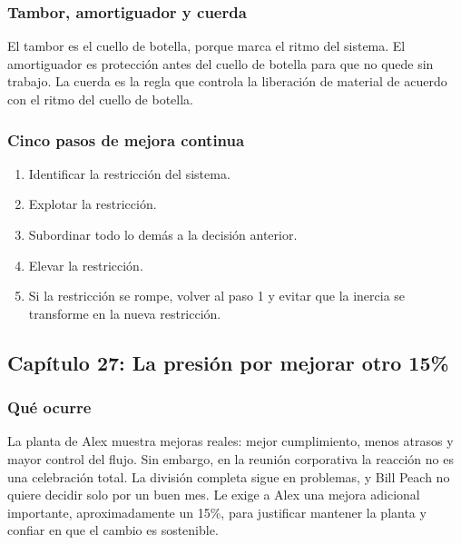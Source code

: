 \documentclass[
  11pt,
]{article}
\providecommand{\tightlist}{%
  \setlength{\itemsep}{0pt}\setlength{\parskip}{0pt}}
\begin{document}
\hypertarget{tambor-amortiguador-y-cuerda}{%
\subsubsection{Tambor, amortiguador y
cuerda}\label{tambor-amortiguador-y-cuerda}}

El tambor es el cuello de botella, porque marca el ritmo del sistema. El
amortiguador es protección antes del cuello de botella para que no quede
sin trabajo. La cuerda es la regla que controla la liberación de
material de acuerdo con el ritmo del cuello de botella.

\hypertarget{cinco-pasos-de-mejora-continua}{%
\subsubsection{Cinco pasos de mejora
continua}\label{cinco-pasos-de-mejora-continua}}

\begin{enumerate}
\def\labelenumi{\arabic{enumi}.}
\tightlist
\item
  Identificar la restricción del sistema.
\item
  Explotar la restricción.
\item
  Subordinar todo lo demás a la decisión anterior.
\item
  Elevar la restricción.
\item
  Si la restricción se rompe, volver al paso 1 y evitar que la inercia
  se transforme en la nueva restricción.
\end{enumerate}

\hypertarget{capuxedtulo-27-la-presiuxf3n-por-mejorar-otro-15}{%
\subsection{Capítulo 27: La presión por mejorar otro
15\%}\label{capuxedtulo-27-la-presiuxf3n-por-mejorar-otro-15}}

\hypertarget{quuxe9-ocurre}{%
\subsubsection{Qué ocurre}\label{quuxe9-ocurre}}

La planta de Alex muestra mejoras reales: mejor cumplimiento, menos
atrasos y mayor control del flujo. Sin embargo, en la reunión
corporativa la reacción no es una celebración total. La división
completa sigue en problemas, y Bill Peach no quiere decidir solo por un
buen mes. Le exige a Alex una mejora adicional importante,
aproximadamente un 15\%, para justificar mantener la planta y confiar en
que el cambio es sostenible.
\end{document}
